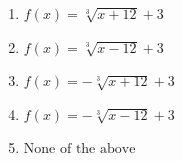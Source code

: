 \documentclass[14pt]{extbook}
\begin{document}
\begin{enumerate}
{\begin{center}
\end{center}
\begin{enumerate}[label=\Alph*.]
\item \( f(x) = \sqrt[3]{x + 12} + 3 \)
\item \( f(x) = \sqrt[3]{x - 12} + 3 \)
\item \( f(x) = - \sqrt[3]{x + 12} + 3 \)
\item \( f(x) = - \sqrt[3]{x - 12} + 3 \)
\item \( \text{None of the above} \)

\end{enumerate} }
\end{enumerate}
\end{document}

